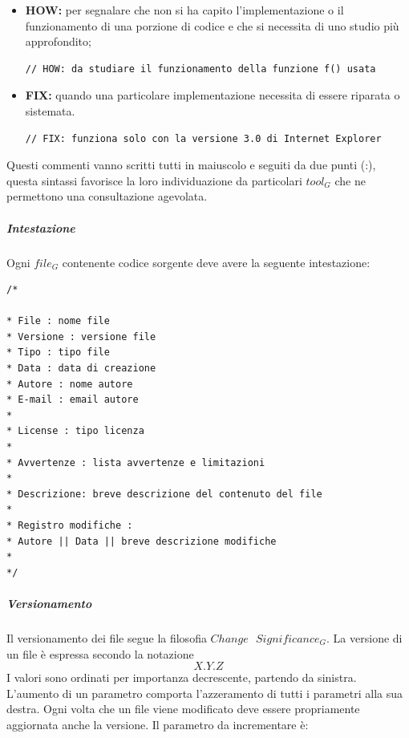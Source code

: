 \begin{itemize}
\begin{itemize}
				\item \textbf{HOW:} per segnalare che non si ha capito l'implementazione o il funzionamento di una porzione di codice e che si necessita di uno studio più approfondito;
				\begin{lstlisting}
// HOW: da studiare il funzionamento della funzione f() usata
				\end{lstlisting}
				
				\item \textbf{FIX:} quando una particolare implementazione necessita di essere riparata o sistemata.
				\begin{lstlisting}
// FIX: funziona solo con la versione 3.0 di Internet Explorer
				\end{lstlisting}
			\end{itemize}
			Questi commenti vanno scritti tutti in maiuscolo e seguiti da due punti (:), questa sintassi favorisce la loro individuazione da particolari $tool_G$ che ne permettono una consultazione agevolata.
			
			\end{itemize}
			\subparagraph{Intestazione} \Spazio
			Ogni $file_G$ contenente codice sorgente deve avere la seguente intestazione:
			\begin{lstlisting}
/*

* File : nome file
* Versione : versione file
* Tipo : tipo file
* Data : data di creazione
* Autore : nome autore 
* E-mail : email autore 
*
* License : tipo licenza				
*				
* Avvertenze : lista avvertenze e limitazioni
*
* Descrizione: breve descrizione del contenuto del file
*
* Registro modifiche :
* Autore || Data || breve descrizione modifiche
*
*/
			\end{lstlisting}
			\subparagraph{Versionamento} \Spazio
			Il versionamento dei file segue la filosofia $Change\textbf{ }Significance_G$. La versione di un file è espressa secondo la notazione $$X.Y.Z$$ I valori sono ordinati per importanza decrescente, partendo da sinistra. L'aumento di un parametro comporta l'azzeramento di tutti i parametri alla sua destra. Ogni volta che un file viene modificato deve essere propriamente aggiornata anche la versione. Il parametro da incrementare è:
